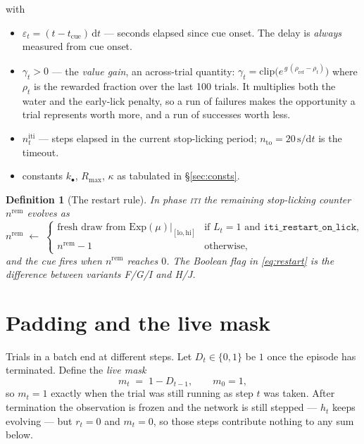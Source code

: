 \documentclass[11pt]{article}
\newtheorem{definition}{Definition}
\newcommand{\1}{\mathbf{1}}
\begin{document}
\noindent with
\begin{itemize}
  \item $\varepsilon_t = (t - t_{\mathrm{cue}})\,\mathrm{d}t$ --- seconds elapsed since cue
        onset. The delay is \emph{always} measured from cue onset.
  \item $\gamma_t > 0$ --- the \emph{value gain}, an across-trial quantity:
        $\gamma_t = \mathrm{clip}\bigl(e^{\,g\,(\rho_{\mathrm{ref}} - \rho_t)}\bigr)$ where
        $\rho_t$ is the rewarded fraction over the last 100 trials. It multiplies both the
        water and the early-lick penalty, so a run of failures makes the opportunity a trial
        represents worth more, and a run of successes worth less.
  \item $n^{\mathrm{iti}}_t$ --- steps elapsed in the current stop-licking period;
        $n_{\mathrm{to}} = 20\,\mathrm{s}/\mathrm{d}t$ is the timeout.
  \item constants $k_\bullet$, $R_{\max}$, $\kappa$ as tabulated in \S\ref{sec:consts}.
\end{itemize}

\begin{definition}[The restart rule]
In phase \textsc{iti} the remaining stop-licking counter $n^{\mathrm{rem}}$ evolves as
\begin{equation}
  n^{\mathrm{rem}} \;\leftarrow\;
  \begin{cases}
    \text{fresh draw from } \mathrm{Exp}(\mu)\big|_{[\mathrm{lo},\mathrm{hi}]}
      & \text{if } L_t = 1 \text{ and } \texttt{iti\_restart\_on\_lick},\\
    n^{\mathrm{rem}} - 1 & \text{otherwise,}
  \end{cases}
  \label{eq:restart}
\end{equation}
and the cue fires when $n^{\mathrm{rem}}$ reaches $0$. The Boolean flag in \eqref{eq:restart}
is the difference between variants F/G/I and H/J.
\end{definition}

\section{Padding and the live mask}\label{sec:mask}

Trials in a batch end at different steps. Let $D_t \in \{0,1\}$ be $1$ once the episode has
terminated. Define the \emph{live mask}
\begin{equation}
  m_t \;=\; 1 - D_{t-1}, \qquad m_0 = 1,
\end{equation}
so $m_t = 1$ exactly when the trial was still running as step $t$ was taken. After termination
the observation is frozen and the network is still stepped --- $h_t$ keeps evolving --- but
$r_t = 0$ and $m_t = 0$, so those steps contribute nothing to any sum below.
\end{document}
